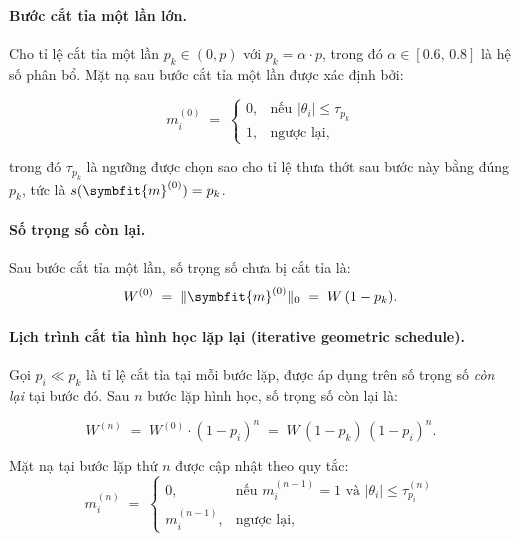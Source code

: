 \paragraph{\textbf{Bước cắt tỉa một lần lớn.}}
Cho tỉ lệ cắt tỉa một lần $p_k \in (0, p)$ với $p_k = \alpha \cdot p$, trong đó $\alpha \in [0.6,\, 0.8]$ là hệ số phân bổ.
Mặt nạ sau bước cắt tỉa một lần được xác định bởi:

\begin{equation}
    m_i^{(0)} \;=\;
    \begin{cases}
        0, & \text{nếu } |\theta_i| \leq \tau_{p_k} \\
        1, & \text{ngược lại,}
    \end{cases}
    \label{eq:oneshot-mask}
\end{equation}

trong đó $\tau_{p_k}$ là ngưỡng được chọn sao cho tỉ lệ thưa thớt sau bước này bằng đúng $p_k$, tức là $s(\symbfit{m}^{(0)}) = p_k$.

\paragraph{\textbf{Số trọng số còn lại.}}
Sau bước cắt tỉa một lần, số trọng số chưa bị cắt tỉa là:
\begin{equation}
    W^{(0)} \;=\; \|\symbfit{m}^{(0)}\|_0 \;=\; W\,(1 - p_k).
    \label{eq:remaining-after-oneshot}
\end{equation}

\paragraph{\textbf{Lịch trình cắt tỉa hình học lặp lại (iterative geometric schedule).}}
Gọi $p_i \ll p_k$ là tỉ lệ cắt tỉa tại mỗi bước lặp, được áp dụng trên số trọng số \emph{còn lại} tại bước đó.
Sau $n$ bước lặp hình học, số trọng số còn lại là:

\begin{equation}
    W^{(n)} \;=\; W^{(0)} \cdot (1 - p_i)^{n}
    \;=\; W\,(1 - p_k)\,(1 - p_i)^{n}.
    \label{eq:geom-remaining}
\end{equation}

Mặt nạ tại bước lặp thứ $n$ được cập nhật theo quy tắc:
\begin{equation}
    m_i^{(n)} \;=\;
    \begin{cases}
        0,           & \text{nếu } m_i^{(n-1)} = 1 \text{ và }
        |\theta_i| \leq \tau_{p_i}^{(n)}                       \\
        m_i^{(n-1)}, & \text{ngược lại,}
    \end{cases}
    \label{eq:iter-mask}
\end{equation}

